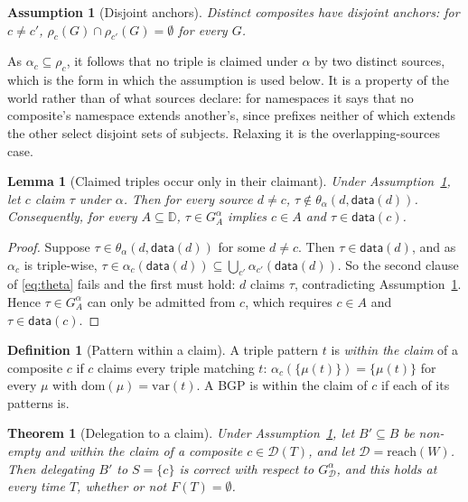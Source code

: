 \documentclass[11pt,a4paper]{article}
\theoremstyle{definition}
\newtheorem{definition}{Definition}
\theoremstyle{plain}
\newtheorem{lemma}{Lemma}
\newtheorem{theorem}{Theorem}
\newtheorem{assumption}{Assumption}
\theoremstyle{remark}
\newcommand{\Dd}{\mathcal{D}}
\newcommand{\Du}{\mathbb{D}}
\newcommand{\dataf}{\mathsf{data}}
\newcommand{\reach}{\mathrm{reach}}
\begin{document}
\begin{assumption}[Disjoint anchors]
\label{as:disjoint}
Distinct composites have disjoint anchors: for $c \neq c'$,
$\rho_c(G) \cap \rho_{c'}(G) = \emptyset$ for every $G$.
\end{assumption}

\noindent
As $\alpha_c \subseteq \rho_c$, it follows that no triple is claimed under $\alpha$ by
two distinct sources, which is the form in which the assumption is used below. It is a
property of the world rather than of what sources declare: for namespaces it says that
no composite's namespace extends another's, since prefixes neither of which extends the
other select disjoint sets of subjects. Relaxing it is the overlapping-sources case.

\begin{lemma}[Claimed triples occur only in their claimant]
\label{lem:exclusive}
Under Assumption~\ref{as:disjoint}, let $c$ claim $\tau$ under $\alpha$. Then for every
source $d \neq c$, $\tau \notin \theta_\alpha(d, \dataf(d))$. Consequently, for every
$A \subseteq \Du$, $\tau \in G^{\alpha}_A$ implies $c \in A$ and $\tau \in \dataf(c)$.
\end{lemma}

\begin{proof}
Suppose $\tau \in \theta_\alpha(d, \dataf(d))$ for some $d \neq c$. Then
$\tau \in \dataf(d)$, and as $\alpha_c$ is triple-wise,
$\tau \in \alpha_c(\dataf(d)) \subseteq \bigcup_{c'} \alpha_{c'}(\dataf(d))$. So the
second clause of \eqref{eq:theta} fails and the first must hold: $d$ claims $\tau$,
contradicting Assumption~\ref{as:disjoint}. Hence $\tau \in G^{\alpha}_A$ can only be
admitted from $c$, which requires $c \in A$ and $\tau \in \dataf(c)$.
\end{proof}

\begin{definition}[Pattern within a claim]
\label{def:within}
A triple pattern $t$ is \emph{within the claim} of a composite $c$ if $c$ claims every
triple matching $t$: $\alpha_c(\{\mu(t)\}) = \{\mu(t)\}$ for every $\mu$ with
$\mathrm{dom}(\mu) = \mathrm{var}(t)$. A BGP is within the claim of $c$ if each of its
patterns is.
\end{definition}

\begin{theorem}[Delegation to a claim]
\label{thm:claim-delegation}
Under Assumption~\ref{as:disjoint}, let $B' \subseteq B$ be non-empty and within the
claim of a composite $c \in \Dd(T)$, and let $\Dd = \reach(W)$. Then delegating $B'$ to
$S = \{c\}$ is correct with respect to $G^{\alpha}_{\Dd}$, and this holds at every
time $T$, whether or not $F(T) = \emptyset$.
\end{theorem}
\end{document}
